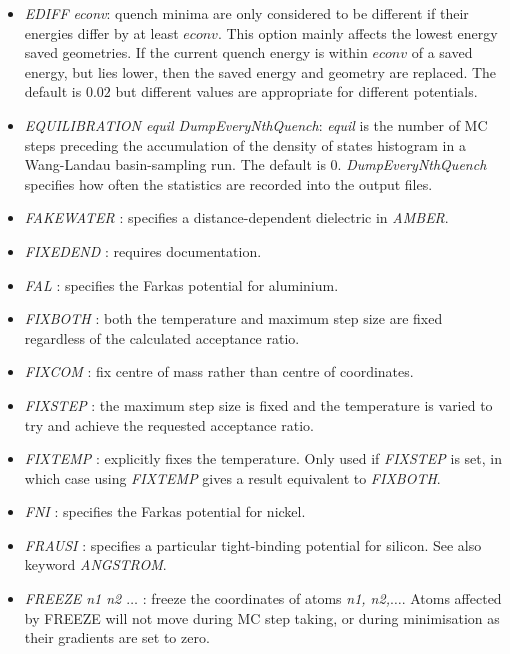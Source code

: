 \documentclass[12pt,a4paper,dvips]{article}
\begin{document}
\begin{itemize}
\item {\it EDIFF econv\/}: quench minima are only considered to be different if their
energies differ by at least $econv$. This option mainly affects the lowest energy
saved geometries. If the current quench energy is within $econv$ of a saved energy, but
lies lower, then the saved energy and geometry are replaced.
The default is $0.02$ but different values are appropriate for different potentials.

\item {\it EQUILIBRATION equil DumpEveryNthQuench\/}: {\it equil} is the number of 
MC steps preceding the accumulation of the
density of states histogram in a Wang-Landau
basin-sampling run. The default is 0. {\it DumpEveryNthQuench} specifies how often the
statistics are recorded into the output files.

\item {\it FAKEWATER \/}: specifies a distance-dependent dielectric in {\it AMBER\/}.

\item {\it FIXEDEND \/}: requires documentation.

\item {\it FAL \/}: specifies the Farkas potential for aluminium.

\item {\it FIXBOTH \/}: both the temperature and maximum step size are fixed regardless of
the calculated acceptance ratio.

\item {\it FIXCOM \/}: fix centre of mass rather than centre of coordinates.

\item {\it FIXSTEP \/}: the maximum step size is fixed and the temperature is varied to
try and achieve the requested acceptance ratio.

\item {\it FIXTEMP \/}: explicitly fixes the temperature. Only used if {\it FIXSTEP\/} is set, in 
which case using {\it FIXTEMP\/} gives a result equivalent to {\it FIXBOTH\/}.

\item {\it FNI \/}: specifies the Farkas potential for nickel.

\item {\it FRAUSI \/}: specifies a particular tight-binding potential for silicon.
See also keyword {\it ANGSTROM\/}.

\item {\it FREEZE n1 n2 $\ldots$ \/}: freeze the coordinates of atoms {\it n1, n2,$\ldots$}. Atoms affected by FREEZE will not move during MC step taking, 
or during minimisation as their gradients are set to zero.


\end{itemize}
\end{document}
